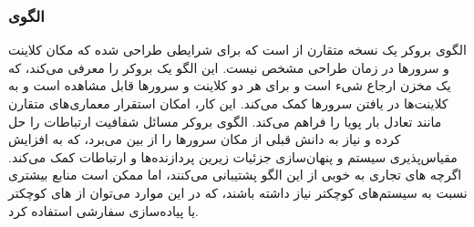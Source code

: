 \subsubsection{الگوی }
\label{distrBrokerSec}
\begin{RTL}
الگوی بروکر \cite{ref4}
یک نسخه متقارن از  است که برای شرایطی
طراحی شده که مکان کلاینت و سرورها در زمان طراحی مشخص نیست. این الگو
یک بروکر را معرفی می‌کند، که یک مخزن ارجاع شیء است
و برای هر دو کلاینت و سرورها قابل مشاهده است و
به کلاینت‌ها در یافتن سرورها کمک می‌کند. این کار، امکان استقرار
معماری‌های متقارن مانند تعادل بار پویا را فراهم می‌کند. الگوی بروکر
مسائل شفافیت ارتباطات را حل کرده و نیاز به دانش قبلی از مکان سرورها
را از بین می‌برد، که به افزایش مقیاس‌پذیری سیستم و پنهان‌سازی جزئیات زیرین
پردازنده‌ها و ارتباطات کمک می‌کند. اگرچه های
تجاری به خوبی از این الگو پشتیبانی می‌کنند، اما ممکن است منابع بیشتری
نسبت به سیستم‌های کوچکتر نیاز داشته باشند، که در این
موارد می‌توان از های کوچکتر یا پیاده‌سازی سفارشی استفاده کرد.
\end{RTL}
